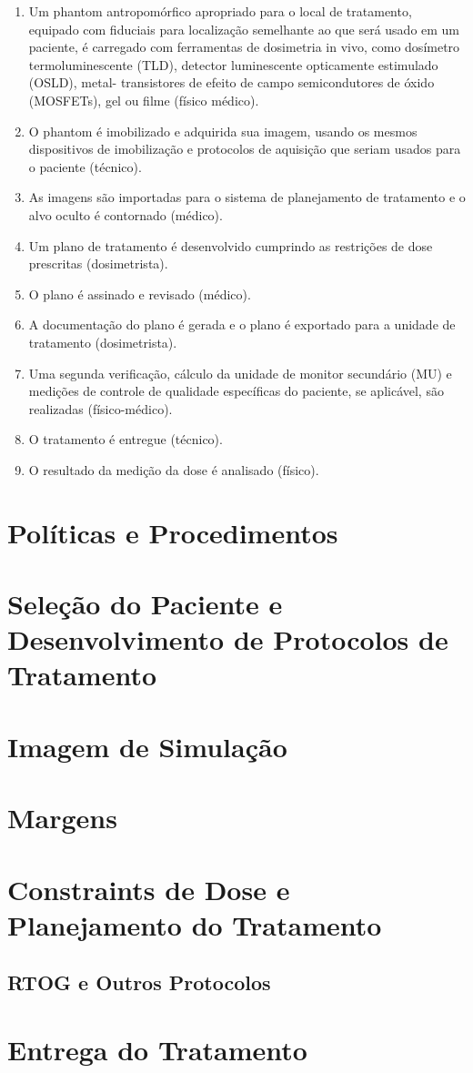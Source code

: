 \documentclass[11pt,a4paper]{article}
\begin{document}
	\begin{enumerate}[label=\textcolor{CarnationPink}{\arabic*${}^\circ$}]
		\item Um phantom  antropomórfico apropriado para o local de tratamento, equipado com fiduciais para localização semelhante ao que será usado em um paciente, é carregado com ferramentas de dosimetria in vivo, como dosímetro termoluminescente (TLD), detector luminescente opticamente estimulado (OSLD), metal- transistores de efeito de campo semicondutores de óxido (MOSFETs), gel ou filme (físico médico).
		\item O phantom é imobilizado e adquirida sua imagem, usando os mesmos dispositivos de imobilização e protocolos de aquisição que seriam usados para o paciente (técnico).
		\item As imagens são importadas para o sistema de planejamento de tratamento e o alvo oculto é contornado (médico).
		\item Um plano de tratamento é desenvolvido cumprindo as restrições de dose prescritas (dosimetrista).
		\item O plano é assinado e revisado (médico).
		\item A documentação do plano é gerada e o plano é exportado para a unidade de tratamento (dosimetrista).
		\item Uma segunda verificação, cálculo da unidade de monitor secundário (MU) e medições de controle de qualidade específicas do paciente, se aplicável, são realizadas (físico-médico).
		\item O tratamento é entregue (técnico).
		\item O resultado da medição da dose é analisado (físico).
	\end{enumerate}


\section{Políticas e Procedimentos}


\section{Seleção do Paciente e Desenvolvimento de Protocolos de Tratamento}



\section{Imagem de Simulação}


\section{Margens}


\section{Constraints de Dose e Planejamento do Tratamento}

\subsection*{RTOG e Outros Protocolos}

\section{Entrega do Tratamento}




\end{document}

